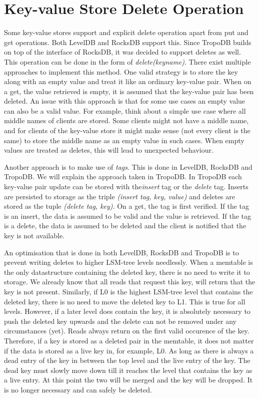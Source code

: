 \section{Key-value Store Delete Operation}
Some key-value stores support and explicit delete operation apart from put and get operations. Both LevelDB and RocksDB support this. Since TropoDB builds on top of the interface of RocksDB, it was decided to support deletes as well. This operation can be done in the form of \textit{delete(keyname)}. There exist multiple approaches to implement this method. One valid strategy is to store the key along with an empty value and treat it like an ordinary key-value pair. When on a get, the value retrieved is empty, it is assumed that the key-value pair has been deleted. An issue with this approach is that for some use cases an empty value can also be a valid value. For example, think about a simple use case where all middle names of clients are stored. Some clients might not have a middle name, and for clients of the key-value store it might make sense (not every client is the same) to store the middle name as an empty value in such cases. When empty values are treated as deletes, this will lead to unexpected behaviour. 

Another approach is to make use of \textit{tags}. This is done in LevelDB, RocksDB and TropoDB. We will explain the approach taken in TropoDB. In TropoDB each key-value pair update can be stored with the\textit{insert} tag or the \textit{delete} tag. Inserts are persisted to storage as the triple \textit{(insert tag, key, value)} and deletes are stored as the tuple \textit{(delete tag, key)}. On a get, the tag is first verified. If the tag is an insert, the data is assumed to be valid and the value is retrieved. If the tag is a delete, the data is assumed to be deleted and the client is notified that the key is not available.

An optimisation that is done in both LevelDB, RocksDB and TropoDB is to prevent writing deletes to higher LSM-tree levels needlessly. When a memtable is the only datastructure containing the deleted key, there is no need to write it to storage. We already know that all reads that request this key, will return that the key is not present. Similarly, if L0 is the highest LSM-tree level that contains the deleted key, there is no need to move the deleted key to L1. This is true for all levels. However, if a later level does contain the key, it is absolutely necessary to push the deleted key upwards and the delete can not be removed under any circumstances (yet). Reads always return on the first valid occurence of the key. Therefore, if a key is stored as a deleted pair in the memtable, it does not matter if the data is stored as a live key in, for example, L0. As long as there is always a dead entry of the key in between the top level and the live entry of the key. The dead key must slowly move down till it reaches the level that contains the key as a live entry. At this point the two will be merged and the key will be dropped. It is no longer necessary and can safely be deleted.  

